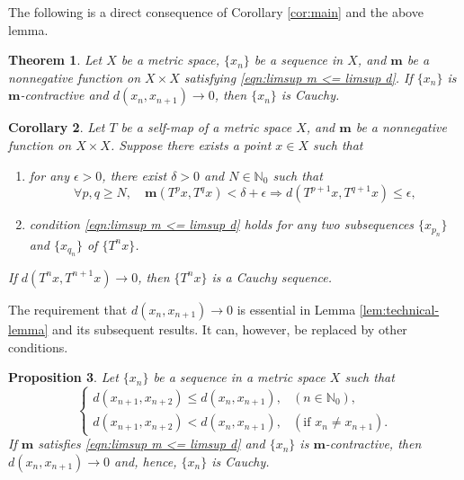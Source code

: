 \documentclass[a4paper,10pt,twoside,reqno]{amsart}
\newtheorem{thm}{Theorem}[section]
\newtheorem{prop}[thm]{Proposition}
\newtheorem{cor}[thm]{Corollary}
\theoremstyle{definition}
\theoremstyle{remark}
\newcommand{\set}[1]{\{#1\}}
\newcommand{\de}{\delta}
\newcommand{\e}{\epsilon}
\newcommand{\N}{\mathbb{N}}
\newcommand{\m}{\mathbf{m}}
\numberwithin{equation}{section}
\begin{document}
The following is a direct consequence of Corollary \ref{cor:main} and
the above lemma.

\begin{thm}
\label{thm:m-contractive-sequences-are-Cauchy}
  Let $X$ be a metric space, $\{x_n\}$ be a sequence in $X$, and
  $\m$ be a nonnegative function on $X\times X$ satisfying \eqref{eqn:limsup m <= limsup d}.
  If $\{x_n\}$ is $\m$-contractive and $d(x_n,x_{n+1})\to0$, then $\{x_n\}$ is Cauchy.
\end{thm}

\begin{cor}
\label{cor:m-contractive-orbits}
  Let $T$ be a self-map of a metric space $X$, and $\m$ be a nonnegative function on $X\times X$.
  Suppose there exists a point $x\in X$ such that
  \begin{enumerate}[\upshape(i)]
    \item for any $\e>0$, there exist $\de>0$ and $N\in\N_0$ such that
    \begin{equation}\label{eqn:m-contractive-orbits}
      \forall p,q\geq N, \quad
       \m(T^px, T^qx) < \de+\e \Longrightarrow d(T^{p+1} x, T^{q+1}x)\leq \e,
    \end{equation}

    \item condition \eqref{eqn:limsup m <= limsup d} holds for any two subsequences
    $\{x_{p_n}\}$ and $\{x_{q_n}\}$ of\/ $\{T^nx\}$.
  \end{enumerate}
  If $d(T^nx,T^{n+1}x)\to0$, then $\set{T^nx}$ is a Cauchy sequence.
\end{cor}

The requirement that $d(x_n,x_{n+1})\to0$ is essential in Lemma \ref{lem:technical-lemma}
and its subsequent results. It can, however, be replaced by other conditions.

\begin{prop}
\label{prop:contractive-sequences}
  Let $\{x_n\}$ be a sequence in a metric space $X$ such that
  \begin{equation}\label{eqn:contractive-sequences}
    \begin{cases}
      d(x_{n+1},x_{n+2}) \leq d(x_n,x_{n+1}), & (n\in\N_0), \\
      d(x_{n+1},x_{n+2}) < d(x_n,x_{n+1}), & (\text{if $x_n\neq x_{n+1}$}).
    \end{cases}
  \end{equation}
  If $\m$ satisfies \eqref{eqn:limsup m <= limsup d} and $\{x_n\}$ is $\m$-contractive,
  then $d(x_n,x_{n+1})\to0$ and, hence, $\{x_n\}$ is Cauchy.
\end{prop}
\end{document}
